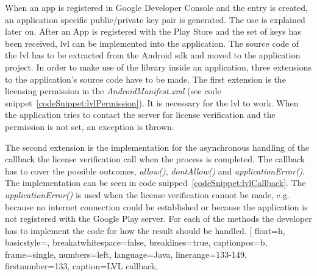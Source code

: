 When an app is registered in Google Developer Console and the entry is created, an application specific public/private key pair is generated.
The use is explained later on. \cite{developersLicensingSetup}
\newline
After an App is registered with the Play Store and the set of keys has been received, \gls{lvl} can be implemented into the application.
The source code of the \gls{lvl} has to be extracted from the Android \gls{sdk} and moved to the application project.
In order to make use of the library inside an application, three extensions to the application's source code have to be made.
 \cite{digipomLvl} \cite{developersLicensingOverview}
\newline
The first extension is the licensing permission in the \textit{AndroidManifest.xml} (see code snippet~\ref{codeSnippet:lvlPermission}).
It is necessary for the \gls{lvl} to work.
When the application tries to contact the server for license verification and the permission is not set, an exception is thrown. \cite{developersLicensingSetup} \cite{developersLicensingAdding}
\newline

The second extension is the implementation for the asynchronous handling of the callback the license verification call when the process is completed.
The callback has to cover the possible outcomes, \textit{allow()}, \textit{dontAllow()} and \textit{applicationError()}.
The implementation can be seen in code snipped~\ref{codeSnippet:lvlCallback}.
The \textit{applicationError()} is used when the license verification cannot be made, e.g. because no internet connection could be established or because the application is not registered with the Google Play server.
For each of the methods the developer has to implement the code for how the result should be handled. \cite{developersLicensingOverview} \cite{developersLicensingSetup} \cite{developersLicensingAdding} \cite{digipomLvl}
\newline
[
  float=h,
  basicstyle=\footnotesize,
  breakatwhitespace=false,
  breaklines=true,
  captionpos=b,
  frame=single,
  numbers=left,
  language=Java,
  linerange={133-149},
  firstnumber=133,
  caption={LVL callback},
